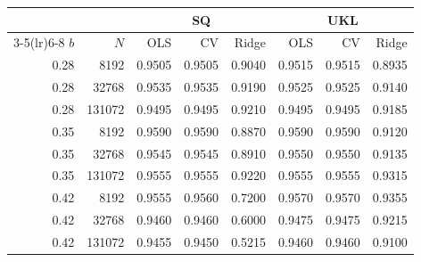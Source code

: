 \begin{tabular}{rrrrrrrr}
\toprule
 & & \multicolumn{3}{c}{SQ} & \multicolumn{3}{c}{UKL} \\
\cmidrule(lr){3-5}\cmidrule(lr){6-8}
$b$ & $N$ & OLS & CV & Ridge & OLS & CV & Ridge \\
\midrule
0.28 & 8192 & 0.9505 & 0.9505 & 0.9040 & 0.9515 & 0.9515 & 0.8935 \\
0.28 & 32768 & 0.9535 & 0.9535 & 0.9190 & 0.9525 & 0.9525 & 0.9140 \\
0.28 & 131072 & 0.9495 & 0.9495 & 0.9210 & 0.9495 & 0.9495 & 0.9185 \\
0.35 & 8192 & 0.9590 & 0.9590 & 0.8870 & 0.9590 & 0.9590 & 0.9120 \\
0.35 & 32768 & 0.9545 & 0.9545 & 0.8910 & 0.9550 & 0.9550 & 0.9135 \\
0.35 & 131072 & 0.9555 & 0.9555 & 0.9220 & 0.9555 & 0.9555 & 0.9315 \\
0.42 & 8192 & 0.9555 & 0.9560 & 0.7200 & 0.9570 & 0.9570 & 0.9355 \\
0.42 & 32768 & 0.9460 & 0.9460 & 0.6000 & 0.9475 & 0.9475 & 0.9215 \\
0.42 & 131072 & 0.9455 & 0.9450 & 0.5215 & 0.9460 & 0.9460 & 0.9100 \\
\bottomrule
\end{tabular}
